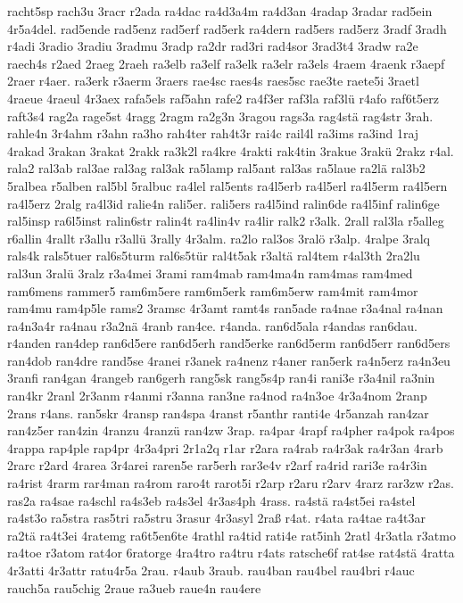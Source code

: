 {racht5sp
rach3u
3racr
r2ada
ra4dac
ra4d3a4m
ra4d3an
4radap
3radar
rad5ein
4r5a4del.
rad5ende
rad5enz
rad5erf
rad5erk
ra4dern
rad5ers
rad5erz
3radf
3radh
r4adi
3radio
3radiu
3radmu
3radp
ra2dr
rad3ri
rad4sor
3rad3t4
3radw
ra2e
raech4s
r2aed
2raeg
2raeh
ra3elb
ra3elf
ra3elk
ra3elr
ra3els
4raem
4raenk
r3aepf
2raer
r4aer.
ra3erk
r3aerm
3raers
rae4sc
raes4s
raes5sc
rae3te
raete5i
3raetl
4raeue
4raeul
4r3aex
rafa5els
raf5ahn
rafe2
ra4f3er
raf3la
raf3lü
r4afo
raf6t5erz
raft3s4
rag2a
rage5st
4ragg
2ragm
ra2g3n
3ragou
rags3a
rag4stä
rag4str
3rah.
rahle4n
3r4ahm
r3ahn
ra3ho
rah4ter
rah4t3r
rai4c
rail4l
ra3ims
ra3ind
1raj
4rakad
3rakan
3rakat
2rakk
ra3k2l
ra4kre
4rakti
rak4tin
3rakue
3rakü
2rakz
r4al.
rala2
ral3ab
ral3ae
ral3ag
ral3ak
ra5lamp
ral5ant
ral3as
ra5laue
ra2lä
ral3b2
5ralbea
r5alben
ral5bl
5ralbuc
ra4lel
ral5ents
ra4l5erb
ra4l5erl
ra4l5erm
ra4l5ern
ra4l5erz
2ralg
ra4l3id
ralie4n
rali5er.
rali5ers
ra4l5ind
ralin6de
ra4l5inf
ralin6ge
ral5insp
ra6l5inst
ralin6str
ralin4t
ra4lin4v
ra4lir
ralk2
r3alk.
2rall
ral3la
r5alleg
r6allin
4rallt
r3allu
r3allü
3rally
4r3alm.
ra2lo
ral3os
3ralö
r3alp.
4ralpe
3ralq
rals4k
rals5tuer
ral6s5turm
ral6s5tür
ral4t5ak
r3altä
ral4tem
r4al3th
2ra2lu
ral3un
3ralü
3ralz
r3a4mei
3rami
ram4mab
ram4ma4n
ram4mas
ram4med
ram6mens
rammer5
ram6m5ere
ram6m5erk
ram6m5erw
ram4mit
ram4mor
ram4mu
ram4p5le
rams2
3ramsc
4r3amt
ramt4s
ran5ade
ra4nae
r3a4nal
ra4nan
ra4n3a4r
ra4nau
r3a2nä
4ranb
ran4ce.
r4anda.
ran6d5ala
r4andas
ran6dau.
r4anden
ran4dep
ran6d5ere
ran6d5erh
rand5erke
ran6d5erm
ran6d5err
ran6d5ers
ran4dob
ran4dre
rand5se
4ranei
r3anek
ra4nenz
r4aner
ran5erk
ra4n5erz
ra4n3eu
3ranfi
ran4gan
4rangeb
ran6gerh
rang5sk
rang5s4p
ran4i
rani3e
r3a4nil
ra3nin
ran4kr
2ranl
2r3anm
r4anmi
r3anna
ran3ne
ra4nod
ra4n3oe
4r3a4nom
2ranp
2rans
r4ans.
ran5skr
4ransp
ran4spa
4ranst
r5anthr
ranti4e
4r5anzah
ran4zar
ran4z5er
ran4zin
4ranzu
4ranzü
ran4zw
3rap.
ra4par
4rapf
ra4pher
ra4pok
ra4pos
4rappa
rap4ple
rap4pr
4r3a4pri
2r1a2q
r1ar
r2ara
ra4rab
ra4r3ak
ra4r3an
4rarb
2rarc
r2ard
4rarea
3r4arei
raren5e
rar5erh
rar3e4v
r2arf
ra4rid
rari3e
ra4r3in
ra4rist
4rarm
rar4man
ra4rom
raro4t
rarot5i
r2arp
r2aru
r2arv
4rarz
rar3zw
r2as.
ras2a
ra4sae
ra4schl
ra4s3eb
ra4s3el
4r3as4ph
4rass.
ra4stä
ra4st5ei
ra4stel
ra4st3o
ra5stra
ras5tri
ra5stru
3rasur
4r3asyl
2raß
r4at.
r4ata
ra4tae
ra4t3ar
ra2tä
ra4t3ei
4ratemg
ra6t5en6te
4rathl
ra4tid
rati4e
rat5inh
2ratl
4r3atla
r3atmo
ra4toe
r3atom
rat4or
6ratorge
4ra4tro
ra4tru
r4ats
ratsche6f
rat4se
rat4stä
4ratta
4r3atti
4r3attr
ratu4r5a
2rau.
r4aub
3raub.
rau4ban
rau4bel
rau4bri
r4auc
rauch5a
rau5chig
2raue
ra3ueb
raue4n
rau4ere
}
